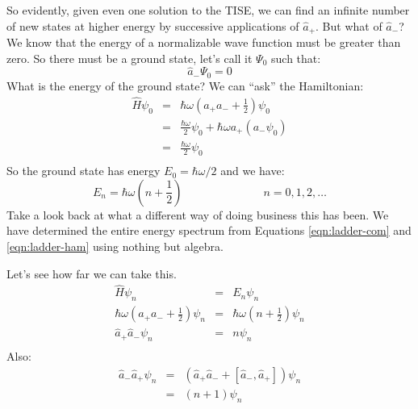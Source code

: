 \documentclass[12pt]{book}
\begin{document}
So evidently, given even one solution to the TISE, we can find an infinite number of new states at higher energy by successive applications of $\hat{a}_+$.  But what of $\hat{a}_-$?  We know that the energy of a normalizable wave function must be greater than zero.  So there must be a ground state, let's call it $\Psi_0$ such that:
\begin{equation}
\hat{a}_- \Psi_0 = 0
\end{equation}
What is the energy of the ground state?  We can ``ask'' the Hamiltonian:
\begin{eqnarray*}
\hat{H} \psi_0 &=& \hbar\omega \left( a_+ a_- + \frac{1}{2} \right) \psi_0 \\
&=& \frac{\hbar\omega}{2}\psi_0 + \hbar\omega a_+ \left( a_- \psi_0 \right)\\
&=& \frac{\hbar\omega}{2}\psi_0\\
\end{eqnarray*}
So the ground state has energy $E_0 = \hbar\omega/2$ and we have:
\begin{equation}
E_n = \hbar \omega \left(n + \frac{1}{2} \right) \hspace{3cm} n = 0,1,2,\ldots
\end{equation}
Take a look back at what a different way of doing business this has been.  We have determined the entire energy spectrum from Equations \ref{eqn:ladder-com} and \ref{eqn:ladder-ham} using nothing but  algebra.

Let's see how far we can take this.
\begin{eqnarray*}
\hat{H} \psi_n &=& E_n \psi_n \\
\hbar\omega \left( a_+ a_- + \frac{1}{2} \right) \psi_n &=& \hbar \omega \left(n + \frac{1}{2} \right) \psi_n \\
\hat{a}_+ \hat{a}_- \psi_n &=& n \psi_n \\
\end{eqnarray*}
Also:
\begin{eqnarray*}
\hat{a}_- \hat{a}_+ \psi_n &=& \left(\hat{a}_+\hat{a}_- + [\hat{a}_-,\hat{a}_+]\right) \psi_n \\
&=& (n+1) \psi_n
\end{eqnarray*}
\end{document}
